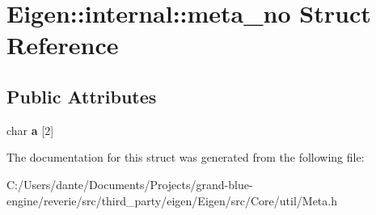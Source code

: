 \hypertarget{struct_eigen_1_1internal_1_1meta__no}{}\section{Eigen\+::internal\+::meta\+\_\+no Struct Reference}
\label{struct_eigen_1_1internal_1_1meta__no}
\subsection*{Public Attributes}
\begin{DoxyCompactItemize}
\item 
\mbox{\label{struct_eigen_1_1internal_1_1meta__no_a7c8b95ad1ca6ee0de2015d5b1700d250}} 
char {\bfseries a} \mbox{[}2\mbox{]}
\end{DoxyCompactItemize}


The documentation for this struct was generated from the following file\+:\begin{DoxyCompactItemize}
\item 
C\+:/\+Users/dante/\+Documents/\+Projects/grand-\/blue-\/engine/reverie/src/third\+\_\+party/eigen/\+Eigen/src/\+Core/util/Meta.\+h\end{DoxyCompactItemize}
